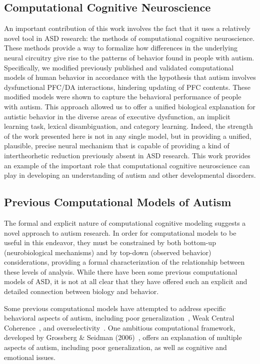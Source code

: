 %
%

\subsection{Computational Cognitive Neuroscience}
An important contribution of this work involves the fact that it uses a relatively novel tool in ASD research: the methods of computational cognitive neuroscience. These methods provide a way to formalize how differences in the underlying neural circuitry give rise to the patterns of behavior found in people with autism. Specifically, we modified previously published and validated computational models of human behavior in accordance with the hypothesis that autism involves dysfunctional PFC/DA interactions, hindering updating of PFC contents. These modified models were shown to capture the behavioral performance of people with autism. This approach allowed us to offer a unified biological explanation for autistic behavior in the diverse areas of executive dysfunction, an implicit learning task, lexical disambiguation, and category learning. Indeed, the strength of the work presented here is not in any single model, but in providing a unified, plausible, precise neural mechanism that is capable of providing a kind of intertheorhetic reduction previously absent in ASD research. This work provides an example of the important role that computational cognitive neuroscience can play in developing an understanding of autism and other developmental disorders.

\subsection{Previous Computational Models of Autism}
The formal and explicit nature of computational cognitive modeling suggests a novel approach to autism research. In order for computational models to be useful in this endeavor, they must be constrained by both bottom-up (neurobiological mechanisms) and by top-down (observed behavior) considerations, providing a formal characterization of the relationship between these levels of analysis. While there have been some previous computational models of ASD, it is not at all clear that they have offered such an explicit and detailed connection between biology and behavior.

Some previous computational models have attempted to address specific behavioral aspects of autism, including poor generalization~\cite{CohenIL:1994:AutismLearning,GustafssonL:1997:AutismMaps}, Weak Central Coherence~\cite{OLoughlinC:2000:Coherence}, and overselectivity~\cite{McClellandJL:2000:Autism}. One ambitious computational framework, developed by Grossberg \& Seidman (2006)~\nocite{GrossbergS:2006:Autism}, offers an explanation of multiple aspects of autism, including poor generalization, as well as cognitive and emotional issues.

